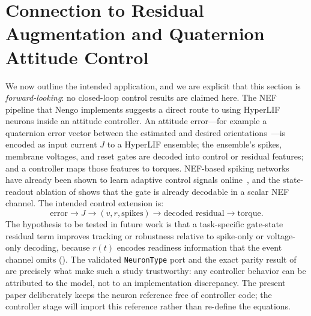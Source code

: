\documentclass[11pt]{article}
\newcommand{\code}[1]{\texttt{#1}}
\begin{document}
\section{Connection to Residual Augmentation and Quaternion Attitude Control}
\label{sec:bridge}
We now outline the intended application, and we are explicit that this section
is \emph{forward-looking}: no closed-loop control results are claimed here. The
NEF pipeline that Nengo implements suggests a direct route to using HyperLIF
neurons inside an attitude controller. An attitude error---for example a
quaternion error vector between the estimated and desired
orientations~\cite{markley2014attitude}---is encoded as input current $J$ to a
HyperLIF ensemble; the ensemble's spikes, membrane voltages, and reset gates are
decoded into control or residual features; and a controller maps those features
to torques. NEF-based spiking networks have already been shown to learn adaptive
control signals online~\cite{dewolf2016reach}, and the state-readout ablation of
 shows that the gate is already decodable in a
scalar NEF channel. The intended control extension is:
\begin{equation}
  \text{error} \to J \to (v, r, \text{spikes}) \to \text{decoded residual} \to \text{torque}.
  \label{eq:pipeline}
\end{equation}
The hypothesis to be tested in future work is that a task-specific gate-state
residual term improves tracking or robustness relative to spike-only or
voltage-only decoding, because $r(t)$ encodes readiness information that the
event channel omits (). The validated \code{NeuronType} port and the exact
parity result of  are precisely what make such a study
trustworthy: any controller behavior can be attributed to the model, not to an
implementation discrepancy. The present paper deliberately keeps the neuron
reference free of controller code; the controller stage will import this
reference rather than re-define the equations.

\end{document}

